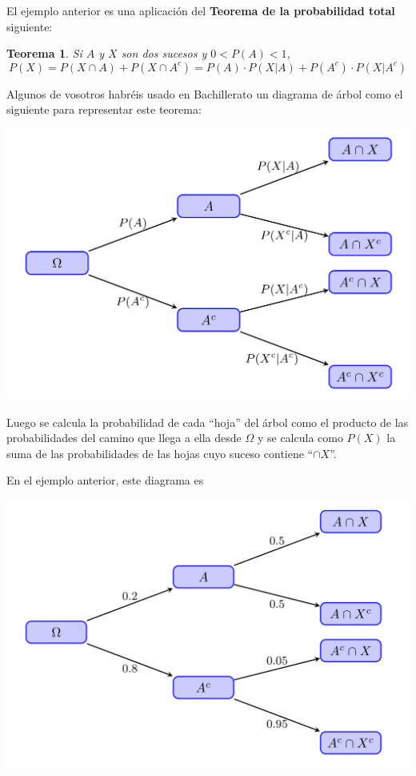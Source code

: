 \documentclass[
]{book}
\newtheorem{theorem}{Teorema}[chapter]
\theoremstyle{definition}
\theoremstyle{definition}
\theoremstyle{definition}
\theoremstyle{definition}
\theoremstyle{remark}
\begin{document}
El ejemplo anterior es una aplicación del \textbf{Teorema de la probabilidad total} siguiente:

\begin{theorem}
\protect\hypertarget{thm:unnamed-chunk-136}{}\label{thm:unnamed-chunk-136}Si \(A\) y \(X\) son dos sucesos y \(0<P(A)<1\),
\[
P(X)= P(X\cap A) +P(X\cap A^c)=P(A)\cdot P(X|A)+ P(A^c)\cdot P(X|A^c)
\]
\end{theorem}

Algunos de vosotros habréis usado en Bachillerato un diagrama de árbol como el siguiente para representar este teorema:

\begin{center}\includegraphics[width=0.8\linewidth]{INREMDN_files/figure-html/arbreTPT} \end{center}

Luego se calcula la probabilidad de cada ``hoja'' del árbol como el producto de las probabilidades del camino que llega a ella desde \(\Omega\) y se calcula como \(P(X)\) la suma de las probabilidades de las hojas cuyo suceso contiene ``\(\cap X\)''.

En el ejemplo anterior, este diagrama es

\begin{center}\includegraphics[width=0.8\linewidth]{INREMDN_files/figure-html/arbreTPTex} \end{center}
\end{document}

